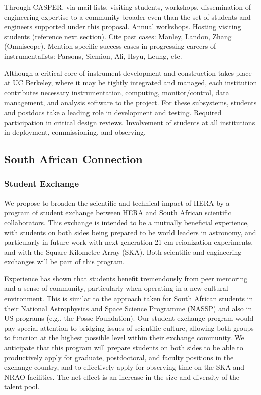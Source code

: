 \documentclass[preprint]{aastex}
\begin{document}
Through CASPER, via mail-lists, visiting students, workshops, dissemination of engineering expertise to a community broader
even than the set of students and engineers supported under this proposal.
Annual workshops.
Hosting visiting students (reference next section). Cite past cases: Manley, Landon, Zhang (Omniscope).
Mention specific success cases in progressing careers of instrumentalists: Parsons, Siemion, Ali, Hsyu, Leung, etc.

Although a critical core of instrument development and construction takes place at UC Berkeley, where it may be tightly
integrated and managed, each institution contributes necessary instrumentation, computing, monitor/control, data management, and
analysis software to the project.  
For these subsystems, students and postdocs take a leading role in development and testing.
Required participation in critical design reviews.
Involvement of students at all institutions in deployment, commissioning, and observing.


\subsection{South African Connection}

\subsubsection{Student Exchange}

We propose to broaden the scientific and technical impact of HERA by a program of student exchange between HERA and South African scientific collaborators.  This exchange is intended to be a mutually beneficial experience, with students on both sides being prepared to be world leaders in astronomy, and particularly in future work with next-generation 21 cm reionization experiments, and with the Square Kilometre Array (SKA).  Both scientific and engineering exchanges will be part of this program.  

Experience has shown that students benefit tremendously from peer mentoring and a sense of community, particularly when operating in a new cultural environment.  This is similar to the approach taken for South African students in their National Astrophysics and Space Science Programme (NASSP)
and also in US programs (e.g., the Posse Foundation).
Our student exchange program would pay special attention to bridging issues of scientific culture, allowing both groups to function at the highest possible level within their exchange community.  We anticipate that this program will prepare students on both sides to be able to productively apply for graduate, postdoctoral, and faculty positions in the exchange country, and to effectively apply for observing time on the SKA and NRAO facilities.  The net effect is an increase in the size and diversity of the talent pool.
\end{document}
